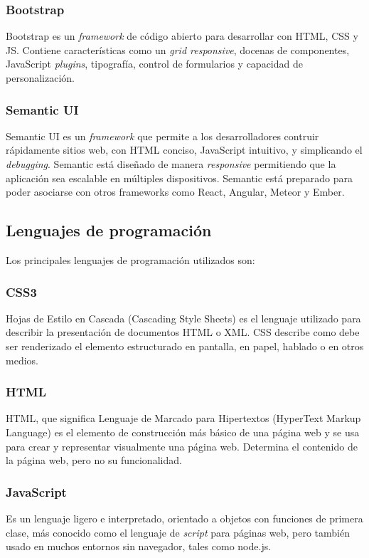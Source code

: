 \subsubsection{Bootstrap}
Bootstrap es un \textit{framework} de código abierto para desarrollar con HTML, CSS y JS. Contiene características como un \textit{grid responsive}, docenas de componentes, JavaScript \textit{plugins}, tipografía, control de formularios y capacidad de personalización\cite{bootstrap}.


\subsubsection{Semantic UI}
Semantic UI es un \textit{framework} que permite a los desarrolladores contruir rápidamente sitios web, con HTML conciso, JavaScript intuitivo, y simplicando el \textit{debugging}. Semantic está diseñado de manera \textit{responsive} permitiendo que la aplicación sea escalable en múltiples dispositivos. Semantic está preparado para poder asociarse con otros frameworks como React, Angular, Meteor y Ember\cite{semantic_github}.


\subsection{Lenguajes de programación}
Los principales lenguajes de programación utilizados son:


\subsubsection{CSS3}
Hojas de Estilo en Cascada (Cascading Style Sheets) es el lenguaje utilizado para describir la presentación de documentos HTML o XML. CSS describe como debe ser renderizado el elemento estructurado en pantalla, en papel, hablado o en otros medios\cite{css_mozilla}.


\subsubsection{HTML}
HTML, que significa Lenguaje de Marcado para Hipertextos (HyperText Markup Language) es el elemento de construcción más básico de una página web y se usa para crear y representar visualmente una página web. Determina el contenido de la página web, pero no su funcionalidad\cite{html_mozilla}.


\subsubsection{JavaScript}
Es un lenguaje ligero e interpretado, orientado a objetos con funciones de primera clase, más conocido como el lenguaje de \textit{script} para páginas web, pero también usado en muchos entornos sin navegador, tales como node.js.


